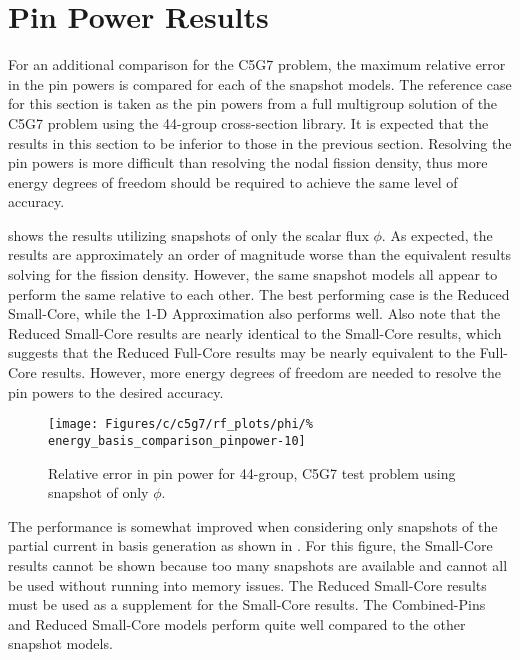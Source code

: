 \section{Pin Power Results}

For an additional comparison for the C5G7 problem, the maximum relative error 
in the pin powers is compared for each of the snapshot models.  The reference 
case for this section is taken as the pin powers from a full multigroup 
solution of the C5G7 problem using the 44-group cross-section 
library.  It is expected that the results in this 
section to be inferior to those in the previous 
section.  Resolving the pin powers is more difficult 
than resolving the nodal fission density, thus more energy degrees of freedom 
should be required to achieve the same level of accuracy. 

 shows the results utilizing snapshots of only the 
scalar flux $\phi$.  As expected, the results are approximately an order of 
magnitude worse than the equivalent results solving for the fission density.  
However, the same snapshot models all appear to perform the same relative to 
each other.  The best performing case is the Reduced Small-Core, while the 1-D 
Approximation also performs well.  Also note that the Reduced Small-Core 
results are nearly identical to the Small-Core results, which suggests that the 
Reduced Full-Core results may be nearly equivalent to the Full-Core results.  
However, more energy degrees of freedom are needed to resolve the pin powers to 
the desired accuracy.

\begin{figure*}[tb]
    \centering
    \texttt{[image: Figures/c/c5g7/rf\_plots/phi/\%
        energy\_basis\_comparison\_pinpower-10]}
    \caption{Relative error in pin power for 44-group, C5G7 test problem 
using snapshot of only $\phi$.}
    \label{fig:c5g7-flux-only-pp}
\end{figure*}

The performance is somewhat improved when considering only snapshots of the 
partial current in basis generation as shown in .  For 
this figure, the Small-Core results cannot be shown because too many snapshots 
are available and cannot all be used without running into memory issues.  The 
Reduced Small-Core results must be used as a supplement for the Small-Core 
results.  The Combined-Pins and Reduced Small-Core models perform quite well 
compared to the other snapshot models.

